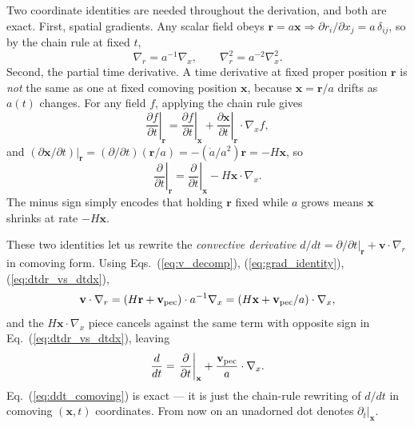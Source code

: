 \documentclass[12pt]{article}
\newcommand{\bx}{\mathbf{x}}
\newcommand{\br}{\mathbf{r}}
\newcommand{\bv}{\mathbf{v}}
\begin{document}
Two coordinate identities are needed throughout the derivation, and
both are exact.  First, spatial gradients.  Any scalar field obeys
$\br = a\bx \Rightarrow \partial r_i/\partial x_j = a\,\delta_{ij}$,
so by the chain rule at fixed $t$,
%
\begin{equation}
  \nabla_r = a^{-1}\nabla_x,
  \qquad
  \nabla_r^2 = a^{-2}\nabla_x^2.
  \label{eq:grad_identity}
\end{equation}
%
Second, the partial time derivative.  A time derivative at fixed
proper position $\br$ is \emph{not} the same as one at fixed comoving
position $\bx$, because $\bx = \br/a$ drifts as $a(t)$ changes.
For any field $f$, applying the chain rule gives
%
\begin{equation}
  \left.\frac{\partial f}{\partial t}\right|_\br
  = \left.\frac{\partial f}{\partial t}\right|_\bx
    + \left.\frac{\partial\bx}{\partial t}\right|_\br
      \!\cdot\nabla_x f,
\end{equation}
%
and $(\partial\bx/\partial t)|_\br = (\partial/\partial t)(\br/a)
= -(\dot a/a^2)\br = -H\bx$, so
%
\begin{equation}
  \left.\frac{\partial}{\partial t}\right|_\br
  = \left.\frac{\partial}{\partial t}\right|_\bx
    - H\bx\cdot\nabla_x.
  \label{eq:dtdr_vs_dtdx}
\end{equation}
%
The minus sign simply encodes that holding $\br$ fixed while $a$
grows means $\bx$ shrinks at rate $-H\bx$.

These two identities let us rewrite the \emph{convective derivative}
$d/dt = \partial/\partial t|_\br + \bv\cdot\nabla_r$ in comoving form.
Using Eqs.~(\ref{eq:v_decomp}), (\ref{eq:grad_identity}),
(\ref{eq:dtdr_vs_dtdx}),
%
\begin{equation}
  \bv\cdot\nabla_r
  = (H\br + \bv_{\rm pec})\cdot a^{-1}\nabla_x
  = (H\bx + \bv_{\rm pec}/a)\cdot\nabla_x,
\end{equation}
%
and the $H\bx\cdot\nabla_x$ piece cancels against the same term with
opposite sign in Eq.~(\ref{eq:dtdr_vs_dtdx}), leaving
%
\begin{equation}
  \frac{d}{dt}
  = \left.\frac{\partial}{\partial t}\right|_\bx
    + \frac{\bv_{\rm pec}}{a}\cdot\nabla_x.
  \label{eq:ddt_comoving}
\end{equation}
%
Eq.~(\ref{eq:ddt_comoving}) is exact --- it is just the chain-rule
rewriting of $d/dt$ in comoving $(\bx, t)$ coordinates.  From now on an unadorned
dot denotes $\partial_t|_\bx$.
\end{document}
